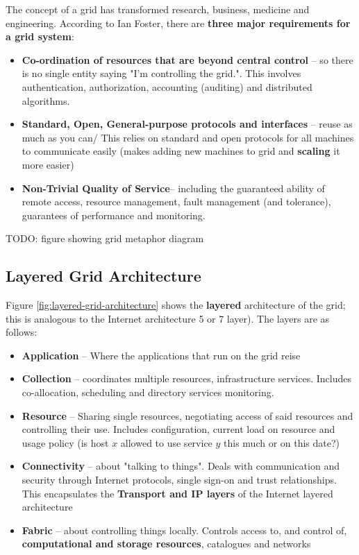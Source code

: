 \documentclass{article}
\begin{document}
The concept of a grid has transformed research, business, medicine and engineering. According to Ian Foster, there are \textbf{three major requirements for a grid system}:
\begin{itemize}
    \item \textbf{Co-ordination of resources that are beyond central control} -- so there is no single entity saying "I'm controlling the grid.". This involves authentication, authorization, accounting (auditing) and distributed algorithms.
    \item \textbf{Standard, Open, General-purpose protocols and interfaces} -- reuse as much as you can/ This relies on standard and open protocols for all machines to communicate easily (makes adding new machines to grid and \textbf{scaling} it more easier)
    \item \textbf{Non-Trivial Quality of Service}--  including the guaranteed ability of remote access, resource management, fault management (and tolerance), guarantees of performance and monitoring.
\end{itemize}

TODO: figure showing grid metaphor diagram

\subsection{Layered Grid Architecture}

Figure \ref{fig:layered-grid-architecture} shows the \textbf{layered} architecture of the grid; this is analogous to the Internet architecture 5 or 7 layer). The layers are as follows:
\begin{itemize}
	\item \textbf{Application} -- Where the applications that run on the grid reise
	\item \textbf{Collection} -- coordinates multiple resources, infrastructure services. Includes co-allocation, scheduling and directory services monitoring.
	\item \textbf{Resource} -- Sharing single resources, negotiating access of said resources and controlling their use. Includes configuration, current load on resource and usage policy (is host $x$ allowed to use service $y$ this much or on this date?)
	\item \textbf{Connectivity} -- about "talking to things". Deals with communication and security through Internet protocols, single sign-on and trust relationships. This encapsulates the \textbf{Transport and IP layers} of the Internet layered architecture
	\item \textbf{Fabric} -- about controlling things locally. Controls access to, and control of, \textbf{computational and storage resources}, catalogues and networks
\end{itemize}
\end{document}
